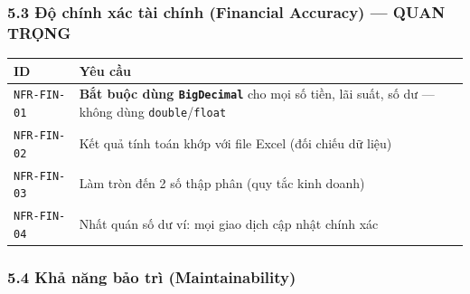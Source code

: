 \documentclass[11pt,a4paper]{article}
\newcounter{none}
\newcommand{\faintline}{%
  \noalign{\global\arrayrulecolor{faintgray}}%
  \hline
  \noalign{\global\arrayrulecolor{black}}%
} %
\begin{document}
\subsubsection{5.3 Độ chính xác tài chính (Financial Accuracy) --- QUAN TRỌNG}\label{ux111ux1ed9-chuxednh-xuxe1c-tuxe0i-chuxednh-financial-accuracy-quan-trux1ecdng}

{\def\LTcaptype{none}
\begin{longtable}[]{@{}
  >{\raggedright\arraybackslash}p{}
  >{\raggedright\arraybackslash}p{}@{}}
\toprule\noalign{}
\begin{minipage}[b]{\linewidth}\raggedright
ID
\end{minipage} & \begin{minipage}[b]{\linewidth}\raggedright
Yêu cầu
\end{minipage} \\
\midrule\noalign{}
\endhead
\bottomrule\noalign{}
\endlastfoot
\texttt{NFR-FIN-01} & \textbf{Bắt buộc dùng \texttt{BigDecimal}} cho mọi số tiền, lãi suất, số dư --- không dùng \texttt{double}/\texttt{float} \\ \faintline
\texttt{NFR-FIN-02} & Kết quả tính toán khớp với file Excel (đối chiếu dữ liệu) \\ \faintline
\texttt{NFR-FIN-03} & Làm tròn đến 2 số thập phân (quy tắc kinh doanh) \\ \faintline
\texttt{NFR-FIN-04} & Nhất quán số dư ví: mọi giao dịch cập nhật chính xác \\
\end{longtable}
}

\subsubsection{5.4 Khả năng bảo trì (Maintainability)}\label{khux1ea3-nux103ng-bux1ea3o-truxec-maintainability}
\end{document}
